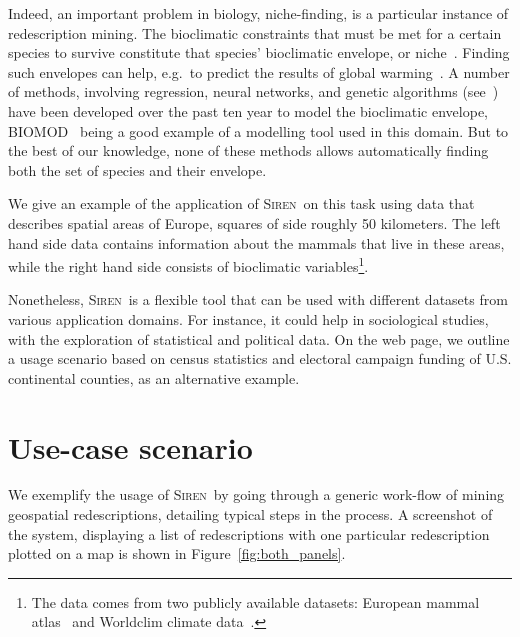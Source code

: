 \documentclass{sig-alternate}
\newcommand{\prg}[1]{\paragraph{#1}}
\newcommand{\Siren}{\textsc{Siren}}
\begin{document}
Indeed, an important problem in biology, niche-finding, is a
particular instance of redescription mining.  The bioclimatic
constraints that must be met for a certain species to survive
constitute that species' bioclimatic envelope, or
niche~\cite{grinnell17niche}.  Finding such envelopes can help, e.g.\
to predict the results of global warming~\cite{pearson03predicting}.
A number of methods, involving regression, neural networks, and
genetic algorithms (see~\cite{soberon05interpretation}) have been
developed over the past ten year to model the bioclimatic envelope,
\textsc{BIOMOD}~\cite{thuiller09biomod} being a good example of a
modelling tool used in this domain.  But to the best of our knowledge,
none of these methods allows automatically finding both the set of
species and their envelope.

We give an example of the application of \Siren\ on this task using data
that describes spatial areas of Europe, squares of side roughly 50
kilometers.  The left hand side data contains information about the
mammals that live in these areas, while the right hand side consists
of bioclimatic variables\footnote{The data comes from two publicly available
datasets: European mammal atlas~\cite{mitchell-jones99atlas} and
Worldclim climate data~\cite{hijmans05very}.}.


Nonetheless, \Siren\ is a flexible tool that can be used with
different datasets from various application domains. For instance, it
could help in sociological studies, with the exploration of
statistical and political data. On the web page, we outline a usage scenario based on census
statistics and electoral campaign funding of U.S. continental counties, as an alternative example.



\section{Use-case scenario}
\label{sec:scenarios}
We exemplify the usage of \Siren\ by going through a generic work-flow of
mining geospatial redescriptions, detailing typical steps in the process.  A screenshot of the system,
displaying a list of redescriptions with one
particular redescription plotted on a map is shown in
Figure~\ref{fig:both_panels}.
\end{document}
